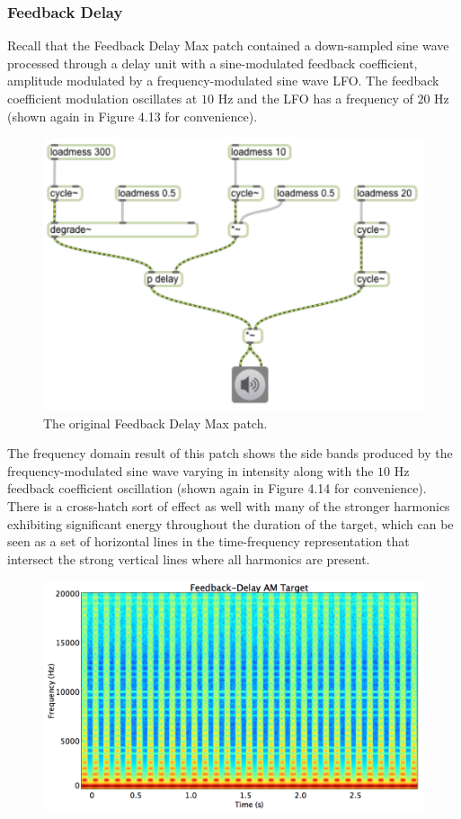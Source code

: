 \documentclass[a4paper,12pt]{report} 	%
\numberwithin{figure}{chapter}
\numberwithin{table}{chapter}
\numberwithin{equation}{chapter}
\begin{document}
\begin{flushleft}
\subsubsection{Feedback Delay}
Recall that the Feedback Delay Max patch contained a down-sampled sine wave processed through a delay unit with a sine-modulated feedback coefficient, amplitude modulated by a frequency-modulated sine wave LFO. The feedback coefficient modulation oscillates at $10$ Hz and the LFO has a frequency of $20$ Hz (shown again in Figure 4.13 for convenience).
\begin{figure}[h!]
\begin{center}
\includegraphics[scale=0.8]{DelayFeedbackAM}
\caption[Original Feedback Delay Max Patch]{The original Feedback Delay Max patch.}
\end{center}
\end{figure}
The frequency domain result of this patch shows the side bands produced by the frequency-modulated sine wave varying in intensity along with the $10$ Hz feedback coefficient oscillation (shown again in Figure 4.14 for convenience). There is a cross-hatch sort of effect as well with many of the stronger harmonics exhibiting significant energy throughout the duration of the target, which can be seen as a set of horizontal lines in the time-frequency representation that intersect the strong vertical lines where all harmonics are present.
\begin{figure}[h!]
\begin{center}
\includegraphics[scale=0.35,width=\linewidth]{FeedbackDelayAMTargetSTFT}

\end{center}
\end{figure}
\end{flushleft}
\end{document}
